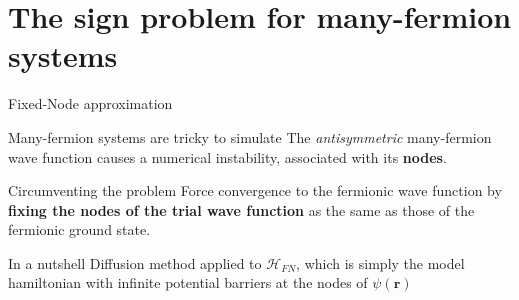 \documentclass{beamer}
\begin{document}
%  	
%
%  	
  \section{The sign problem for many-fermion systems}
  \begin{frame}{Fixed-Node approximation}
  
  \begin{block}{Many-fermion systems are tricky to simulate}
  	The \textit{antisymmetric} many-fermion wave function causes a numerical instability, associated with its \textbf{nodes}.
	\end{block}
	\begin{block}{Circumventing the problem}
  	Force convergence to the fermionic wave function by \textbf{fixing the nodes of the trial wave function} as the same as those of the fermionic ground state.
	\end{block}  	
	\begin{block}{In a nutshell}
	Diffusion method applied to $\mathcal{H}_{FN}$, which is simply the model hamiltonian with infinite potential barriers at the nodes of $\psi (\bm r)$  	 
  	 \end{block}
  	\end{frame}
  	
\end{document}
